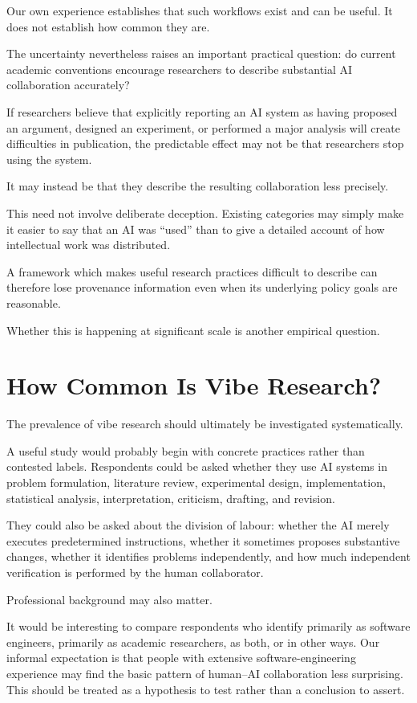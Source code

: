 Our own experience establishes that such workflows exist and can be useful. It does not establish how common they are.

The uncertainty nevertheless raises an important practical question: do current academic conventions encourage researchers to describe substantial AI collaboration accurately?

If researchers believe that explicitly reporting an AI system as having proposed an argument, designed an experiment, or performed a major analysis will create difficulties in publication, the predictable effect may not be that researchers stop using the system.

It may instead be that they describe the resulting collaboration less precisely.

This need not involve deliberate deception. Existing categories may simply make it easier to say that an AI was ``used'' than to give a detailed account of how intellectual work was distributed.

A framework which makes useful research practices difficult to describe can therefore lose provenance information even when its underlying policy goals are reasonable.

Whether this is happening at significant scale is another empirical question.


\section{How Common Is Vibe Research?}

The prevalence of vibe research should ultimately be investigated systematically.

A useful study would probably begin with concrete practices rather than contested labels. Respondents could be asked whether they use AI systems in problem formulation, literature review, experimental design, implementation, statistical analysis, interpretation, criticism, drafting, and revision.

They could also be asked about the division of labour: whether the AI merely executes predetermined instructions, whether it sometimes proposes substantive changes, whether it identifies problems independently, and how much independent verification is performed by the human collaborator.

Professional background may also matter.

It would be interesting to compare respondents who identify primarily as software engineers, primarily as academic researchers, as both, or in other ways. Our informal expectation is that people with extensive software-engineering experience may find the basic pattern of human--AI collaboration less surprising. This should be treated as a hypothesis to test rather than a conclusion to assert.

